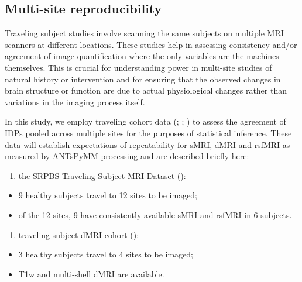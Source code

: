 \documentclass[
  table]{article}
\providecommand{\tightlist}{%
  \setlength{\itemsep}{0pt}\setlength{\parskip}{0pt}}
\begin{document}
\subsection{Multi-site
reproducibility}\label{multi-site-reproducibility}

Traveling subject studies involve scanning the same subjects on multiple
MRI scanners at different locations. These studies help in assessing
consistency and/or agreement of image quantification where the only
variables are the machines themselves. This is crucial for understanding
power in multi-site studies of natural history or intervention and for
ensuring that the observed changes in brain structure or function are
due to actual physiological changes rather than variations in the
imaging process itself.

In this study, we employ traveling cohort data
(;
;
) to assess
the agreement of IDPs pooled across multiple sites for the purposes of
statistical inference. These data will establish expectations of
repeatability for sMRI, dMRI and rsfMRI as measured by ANTsPyMM
processing and are described briefly here:

\begin{enumerate}
\def\labelenumi{\arabic{enumi}.}
\tightlist
\item
  the SRPBS Traveling Subject MRI Dataset
  ():
\end{enumerate}

\begin{itemize}
\item
  9 healthy subjects travel to 12 sites to be imaged;
\item
  of the 12 sites, 9 have consistently available sMRI and rsfMRI in 6
  subjects.
\end{itemize}

\begin{enumerate}
\def\labelenumi{\arabic{enumi}.}
\setcounter{enumi}{1}
\tightlist
\item
  traveling subject dMRI cohort
  ():
\end{enumerate}

\begin{itemize}
\item
  3 healthy subjects travel to 4 sites to be imaged;
\item
  T1w and multi-shell dMRI are available.
\end{itemize}
\end{document}
